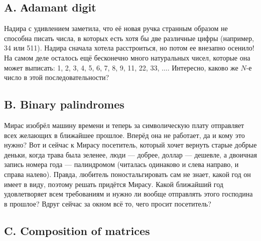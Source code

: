 \subsection*{A. Аdamant digit}

Надира с удивлением заметила, что её новая ручка странным образом не способна писать числа, в которых есть хотя бы две различные цифры (например, 34 или 511). Надира сначала хотела расстроиться, но потом ее внезапно осенило! На самом деле осталось ещё бесконечно много натуральных чисел, которые она может выписать: 1, 2, 3, 4, 5, 6, 7, 8, 9, 11, 22, 33, $\dots$. Интересно, каково же $N$-е число в этой последовательности?





\subsection*{B. Binary palindromes}

Мирас изобрёл машину времени и теперь за символическую плату отправляет всех желающих в ближайшее прошлое. Вперёд она не работает, да и кому это нужно? Вот и сейчас к Мирасу посетитель, который хочет вернуть старые добрые деньки, когда трава была зеленее, люди --- добрее, доллар --- дешевле, а двоичная запись номера года --- палиндромом (читалась одинаково и слева направо, и справа налево). Правда, любитель поностальгировать сам не знает, какой год он имеет в виду, поэтому решать придётся Мирасу. Какой ближайший год удовлетворяет всем требованиям и нужно ли вообще отправлять этого господина в прошлое? Вдруг сейчас за окном всё то, чего просит посетитель?







\subsection*{C. Composition of matrices}

